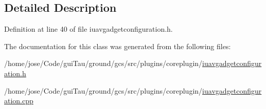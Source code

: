 \subsection{Detailed Description}


Definition at line 40 of file iuavgadgetconfiguration.\-h.



The documentation for this class was generated from the following files\-:\begin{DoxyCompactItemize}
\item 
/home/jose/\-Code/gui\-Tau/ground/gcs/src/plugins/coreplugin/\hyperlink{iuavgadgetconfiguration_8h}{iuavgadgetconfiguration.\-h}\item 
/home/jose/\-Code/gui\-Tau/ground/gcs/src/plugins/coreplugin/\hyperlink{iuavgadgetconfiguration_8cpp}{iuavgadgetconfiguration.\-cpp}\end{DoxyCompactItemize}
